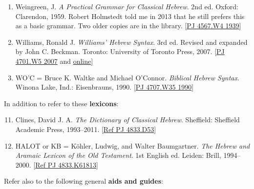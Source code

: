 \documentclass[titlepage]{article}
\begin{document}
\begin{enumerate}
	\item Weingreen, J. \emph{A Practical Grammar for Classical Hebrew}.
	2nd ed. Oxford: Clarendon, 1959. Robert Holmstedt told me in 2013
	that he still prefers this as a basic grammar. Two older copies are
	in the library.
	[\href{http://tyndale.worldcat.org/oclc/926806}{PJ 4567.W4 1939}]

	\item Williams, Ronald J. \emph{Williams' Hebrew Syntax}. 3rd ed.
	Revised and expanded by John C. Beckman. Toronto: University of
	Toronto Press, 2007.
	[\href{http://tyndale.worldcat.org/oclc/84989344}{PJ 4701.W5 2007} and \href{http://ezproxy.mytyndale.ca:2048/login?url=http://search.ebscohost.com/login.aspx?direct=true&db=e093mww&AN=682592&site=ehost-live&scope=site}{online}]

	\item WO'C = Bruce K. Waltke and Michael O'Connor. \emph{Biblical
	Hebrew Syntax}. Winona Lake, Ind.: Eisenbrauns, 1990.
	[\href{http://tyndale.worldcat.org/oclc/20088442}{PJ 4707.W35 1990}]

\end{enumerate}

In addition to \cite{bdb} refer to these \textbf{lexicons}:

\begin{enumerate}\setcounter{enumi}{10}

	\item Clines, David J. A. \emph{The Dictionary of Classical Hebrew}.
	Sheffield: Sheffield Academic Press, 1993--2011.
	[\href{http://tyndale.worldcat.org/oclc/29742583}{Ref PJ 4833.D53}]

	\item HALOT or KB = Köhler, Ludwig, and Walter Baumgartner.
	\emph{The Hebrew and Aramaic Lexicon of the Old Testament}. 1st
	English ed. Leiden: Brill, 1994--2000.
	[\href{http://tyndale.worldcat.org/oclc/30905049}{Ref PJ 4833.K61813}]

\end{enumerate}

Refer also to the following general \textbf{aids and guides}:
\end{document}
